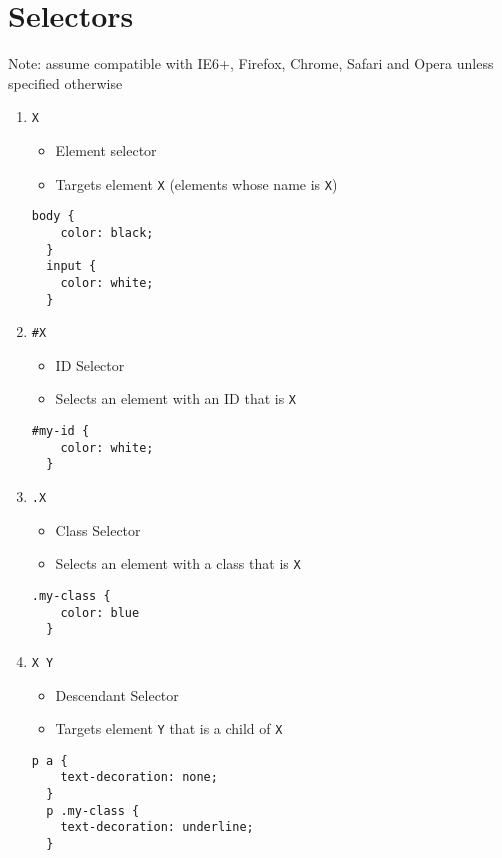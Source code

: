 \documentclass[12pt]{article}
\begin{document}
\section{Selectors}
Note: assume compatible with IE6+, Firefox, Chrome, Safari and Opera unless specified otherwise

\begin{enumerate}
\item {\texttt{X}}
  \begin{itemize}
    \item Element selector
    \item Targets element \texttt{X} (elements whose name is \texttt{X})
  \end{itemize}
  \begin{lstlisting}[frame=single]
  body {
    color: black;
  }
  input {
    color: white;
  }
  \end{lstlisting}

\item {\texttt{\#X}}
  \begin{itemize}
    \item ID Selector
    \item Selects an element with an ID that is \texttt{X}
  \end{itemize}
  \begin{lstlisting}[frame=single]
  #my-id {
    color: white;
  }
  \end{lstlisting}

\item {\texttt{.X}}
  \begin{itemize}
    \item Class Selector
    \item Selects an element with a class that is \texttt{X}
  \end{itemize}
  \begin{lstlisting}[frame=single]
  .my-class {
    color: blue
  }
  \end{lstlisting}

\item {\texttt{X Y}}
  \begin{itemize}
    \item Descendant Selector
    \item Targets element \texttt{Y} that is a child of \texttt{X}
  \end{itemize}
  \begin{lstlisting}[frame=single]
  p a {
    text-decoration: none;
  }
  p .my-class {
    text-decoration: underline;
  }
  \end{lstlisting}


\end{enumerate}
\end{document}
